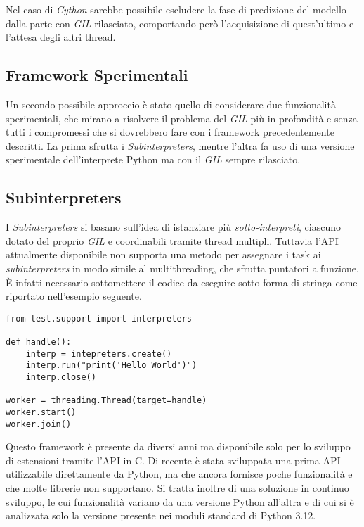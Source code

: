Nel caso di \textit{Cython} sarebbe possibile escludere la fase di predizione
del modello dalla parte con \textit{GIL} rilasciato, comportando però
l'acquisizione di quest'ultimo e l'attesa degli altri thread.

\subsection{Framework Sperimentali}

Un secondo possibile approccio è stato quello di considerare due funzionalità
sperimentali, che mirano a risolvere il problema del \textit{GIL} più in
profondità e senza tutti i compromessi che si dovrebbero fare con i framework
precedentemente descritti. La prima sfrutta i \textit{Subinterpreters}, mentre
l'altra fa uso di una versione sperimentale dell'interprete Python ma con il
\textit{GIL} sempre rilasciato.

\subsection*{Subinterpreters}

I \textit{Subinterpreters} si basano sull'idea di istanziare più
\textit{sotto-interpreti}, ciascuno dotato del proprio \textit{GIL} e
coordinabili tramite thread multipli. Tuttavia l'API attualmente disponibile
non supporta una metodo per assegnare i task ai \textit{subinterpreters} in
modo simile al multithreading, che sfrutta puntatori a funzione. È infatti
necessario sottomettere il codice da eseguire sotto forma di stringa come
riportato nell'esempio seguente.

\begin{lstlisting}[caption={Subinterpreters API Python 3.12}]
from test.support import interpreters

def handle():
	interp = intepreters.create()
	interp.run("print('Hello World')")
	interp.close()

worker = threading.Thread(target=handle)
worker.start()
worker.join()
\end{lstlisting}

Questo framework è presente da diversi anni ma disponibile solo per lo sviluppo
di estensioni tramite l'API in C. Di recente è stata sviluppata una prima API
utilizzabile direttamente da Python, ma che ancora fornisce poche funzionalità
e che molte librerie non supportano. Si tratta inoltre di una soluzione in
continuo sviluppo, le cui funzionalità variano da una versione Python all'altra
e di cui si è analizzata solo la versione presente nei moduli standard di
Python 3.12.

